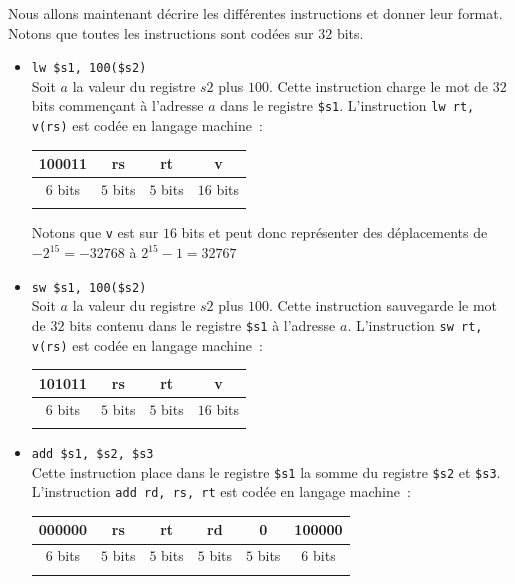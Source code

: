 \documentclass[12pt]{article}
\begin{document}
Nous allons maintenant décrire les différentes instructions et donner leur format. Notons
que toutes les instructions sont codées sur $32$ bits.

\begin{itemize}

\item \verb+lw $s1, 100($s2)+\\
Soit $a$ la valeur du registre $s2$ plus $100$.
Cette instruction charge le mot de $32$ bits commençant à l'adresse $a$ dans le registre \verb+$s1+.
L'instruction \verb+lw rt, v(rs)+ est codée en langage machine~:\\
\begin{center}
\begin{tabular}{cccc}
\hline
\multicolumn{1}{|c}{100011} & \multicolumn{1}{|c}{rs} & \multicolumn{1}{|c}{rt} & \multicolumn{1}{|c|}{v}\\
\hline
$6$ bits & $5$ bits & $5$ bits & $16$ bits\\
&&&\\
\end{tabular}
\end{center}

Notons que \verb+v+ est sur $16$ bits et peut donc représenter des déplacements de $-2^{15}=-32768$ à $2^{15}-1=32767$\\

\item \verb+sw $s1, 100($s2)+\\
Soit $a$ la valeur du registre $s2$ plus $100$.
Cette instruction sauvegarde le mot de $32$ bits contenu dans le registre \verb+$s1+ à l'adresse $a$.
L'instruction \verb+sw rt, v(rs)+ est codée en langage machine~:\\
\begin{center}
\begin{tabular}{cccc}
\hline
\multicolumn{1}{|c}{101011} & \multicolumn{1}{|c}{rs} & \multicolumn{1}{|c}{rt} & \multicolumn{1}{|c|}{v}\\
\hline
$6$ bits & $5$ bits & $5$ bits & $16$ bits\\
&&&\\
\end{tabular}
\end{center}

\item \verb+add $s1, $s2, $s3+\\
Cette instruction place dans le registre \verb+$s1+ la somme du registre \verb+$s2+ et \verb+$s3+.
L'instruction \verb+add rd, rs, rt+ est codée en langage machine~:\\
\begin{center}
\begin{tabular}{cccccc}
\hline
\multicolumn{1}{|c}{000000} & \multicolumn{1}{|c}{rs} & \multicolumn{1}{|c}{rt} & \multicolumn{1}{|c|}{rd} & \multicolumn{1}{|c|}{0} & \multicolumn{1}{|c|}{100000}\\
\hline
$6$ bits & $5$ bits & $5$ bits & $5$ bits & $5$ bits & $6$ bits\\
&&&&&\\
\end{tabular}
\end{center}


\end{itemize}
\end{document}
